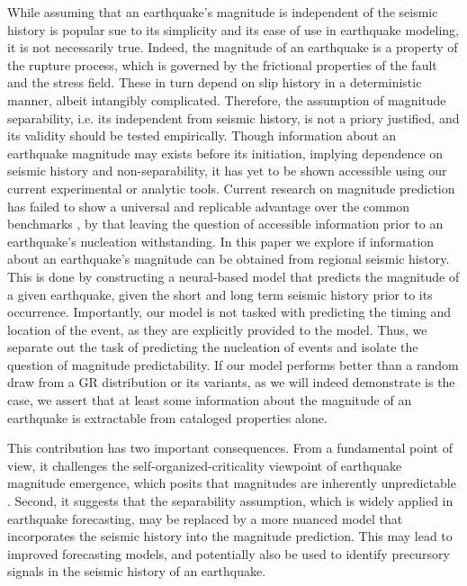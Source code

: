 \documentclass[pdflatex]{sn-jnl}
\begin{document}
While assuming that an earthquake's magnitude is independent of the seismic history is popular sue to its simplicity and its ease of use in earthquake modeling, it is not necessarily true. Indeed, the magnitude of an earthquake is a property of the rupture process, which is governed by the frictional properties of the fault and the stress field. These in turn depend on slip history in a deterministic manner, albeit intangibly complicated. Therefore, the assumption of magnitude separability, i.e. its independent from seismic history, is not a priory justified, and its validity should be tested empirically.
Though information about an earthquake magnitude may exists before its initiation, implying dependence on seismic history and non-separability, it has yet to be shown accessible using our current experimental or analytic tools. Current research on magnitude prediction has failed to show a universal and replicable advantage over the common benchmarks \cite{shcherbakov_forecasting_2019, ogata_exploring_2018, stockman_forecasting_2023,  panakkat_neural_2007}, by that leaving the question of accessible information prior to an earthquake's nucleation withstanding. 
\newline
In this paper we explore if information about an earthquake's magnitude can be obtained from regional seismic history. This is done by constructing a neural-based model that predicts the magnitude of a given earthquake, given the short and long term seismic history prior to its occurrence. Importantly, our model is not tasked with predicting the timing and location of the event, as they are explicitly provided to the model. Thus, we separate out the task of predicting the nucleation of events and isolate the question of magnitude predictability. If our model performs better than a random draw from a GR distribution or its variants, as we will indeed demonstrate is the case, we assert that at least some information about the magnitude of an earthquake is extractable from cataloged properties alone. 


This contribution has two important consequences. From a fundamental point of view, it challenges the self-organized-criticality viewpoint of earthquake magnitude emergence, which posits that magnitudes are inherently unpredictable \cite{olami_self-organized_1992, sornette_self-organized_1989, bak_earthquakes_1989, de_geus_scaling_2022}. Second, it suggests that the separability assumption, which is widely applied in earthquake forecasting, may be replaced by a more nuanced model that incorporates the seismic history into the magnitude prediction. This may lead to improved forecasting models, and potentially also be used to identify precursory signals in the seismic history of an earthquake.
\end{document}
